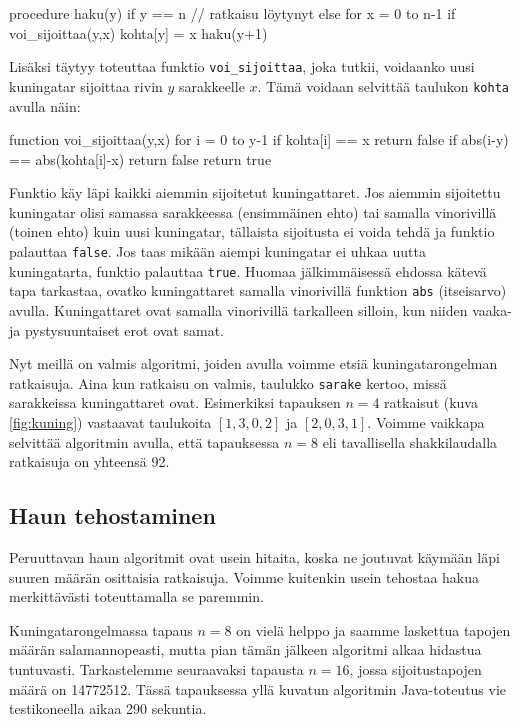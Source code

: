 \begin{code}
procedure haku(y)
    if y == n
        // ratkaisu löytynyt
    else
        for x = 0 to n-1
            if voi_sijoittaa(y,x)
                kohta[y] = x
                haku(y+1)
\end{code}

Lisäksi täytyy toteuttaa funktio \texttt{voi\_sijoittaa},
joka tutkii, voidaanko uusi kuningatar sijoittaa
rivin $y$ sarakkeelle $x$.
Tämä voidaan selvittää taulukon \texttt{kohta} avulla näin:

\begin{code}
function voi_sijoittaa(y,x)
    for i = 0 to y-1
        if kohta[i] == x
            return false
        if abs(i-y) == abs(kohta[i]-x)
            return false
    return true
\end{code}

Funktio käy läpi kaikki aiemmin sijoitetut kuningattaret.
Jos aiemmin sijoitettu kuningatar olisi samassa sarakkeessa
(ensimmäinen ehto) tai samalla vinorivillä (toinen ehto)
kuin uusi kuningatar, tällaista sijoitusta ei voida tehdä
ja funktio palauttaa \texttt{false}.
Jos taas mikään aiempi kuningatar ei uhkaa uutta kuningatarta,
funktio palauttaa \texttt{true}.
Huomaa jälkimmäisessä ehdossa kätevä tapa tarkastaa,
ovatko kuningattaret samalla vinorivillä funktion \texttt{abs}
(itseisarvo) avulla.
Kuningattaret ovat samalla vinorivillä tarkalleen silloin,
kun niiden vaaka- ja pystysuuntaiset erot ovat samat.

Nyt meillä on valmis algoritmi, joiden avulla voimme etsiä
kuningatarongelman ratkaisuja.
Aina kun ratkaisu on valmis, taulukko \texttt{sarake} kertoo,
missä sarakkeissa kuningattaret ovat.
Esimerkiksi tapauksen $n=4$ ratkaisut (kuva \ref{fig:kuning})
vastaavat taulukoita $[1,3,0,2]$ ja $[2,0,3,1]$.
Voimme vaikkapa selvittää algoritmin avulla,
että tapauksessa $n=8$ eli tavallisella shakkilaudalla
ratkaisuja on yhteensä 92.

\subsection{Haun tehostaminen}

Peruuttavan haun algoritmit ovat usein hitaita,
koska ne joutuvat käymään läpi suuren määrän osittaisia ratkaisuja.
Voimme kuitenkin usein tehostaa hakua merkittävästi
toteuttamalla se paremmin.

Kuningatarongelmassa tapaus $n=8$ on vielä helppo ja
saamme laskettua tapojen määrän salamannopeasti,
mutta pian tämän jälkeen algoritmi alkaa hidastua tuntuvasti.
Tarkastelemme seuraavaksi tapausta $n=16$,
jossa sijoitustapojen määrä on 14772512.
Tässä tapauksessa yllä kuvatun algoritmin
Java-toteutus vie testikoneella aikaa 290 sekuntia.

